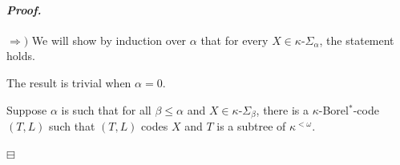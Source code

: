 \documentclass[12pt,a4paper]{amsart}
\newtheorem{claim}{Claim}[thm]
\theoremstyle{definition}
\theoremstyle{remark}
\renewcommand{\mid}{\mathrel{|}\allowbreak}
\newenvironment{cproof}{\paragraph{\emph{Proof.\,}}}{\hfill{$\boxminus$}\par\vspace{2mm}}
\def\borelstar{Borel\nobreak\hspace{1pt}$^*$}
\begin{document}
\begin{cproof}
$\Rightarrow)$ We will show by induction over $\alpha$ that for every $X\in \kappa\text{-}\Sigma_\alpha$, the statement holds.

The result is trivial when $\alpha=0$. 

Suppose $\alpha$ is such that for all $\beta\leq\alpha$ and $X\in \kappa\text{-}\Sigma_\beta$, there is a $\kappa$-\borelstar-code $(T,L)$ such that $(T,L)$ codes $X$ and $T$ is a subtree of $\kappa^{<\omega}$. 

\end{cproof}
\end{document}
